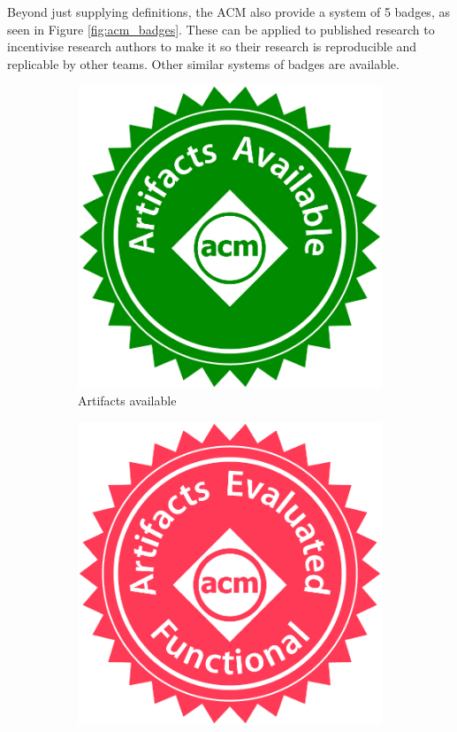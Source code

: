\documentclass[logo,msc,dsti]{infthesis}    %
\begin{document}
Beyond just supplying definitions, the ACM also provide a system of 5 badges, as seen in Figure \ref{fig:acm_badges}. These can be applied to published research to incentivise research authors to make it so their research is reproducible and replicable by other teams. Other similar systems of badges are available.

\begin{figure}
     \centering
     \begin{subfigure}[t]{0.3\columnwidth}
         \centering
         \includegraphics[width=\textwidth]{assets/artifacts_available.jpg}
         \caption{Artifacts available}
         \label{fig:y equals x}
     \end{subfigure}
     \hfill
     \begin{subfigure}[t]{0.3\columnwidth}
         \centering
         \includegraphics[width=\textwidth]{assets/artifacts_evaluated_functional.jpg}

\end{subfigure}
\end{figure}
\end{document}
